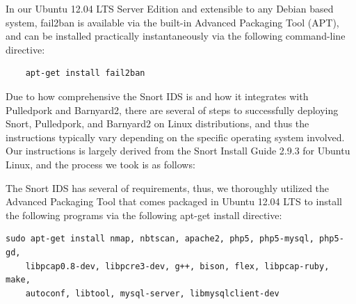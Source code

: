 \documentclass[12pt,letterpaper,titlepage]{report}
\begin{document}
{In our Ubuntu 12.04 LTS Server Edition and extensible to any Debian based
system, fail2ban is available via the built-in Advanced Packaging Tool (APT),
and can be installed practically instantaneously via the following command-line
directive:
\begin{verbatim}
    apt-get install fail2ban
\end{verbatim}
Due to how comprehensive the Snort IDS is and how it integrates with Pulledpork
and Barnyard2, there are several of steps to successfully deploying Snort,
Pulledpork, and Barnyard2 on Linux distributions, and thus the instructions
typically vary depending on the specific operating system involved.  Our
instructions is largely derived from the Snort Install Guide 2.9.3 for Ubuntu
Linux, and the process we took is as follows:

The Snort IDS has several of requirements, thus, we thoroughly utilized the
Advanced Packaging Tool that comes packaged in Ubuntu 12.04 LTS to install the
following programs via the following apt-get install directive:


\begin{verbatim}
sudo apt-get install nmap, nbtscan, apache2, php5, php5-mysql, php5-gd,
    libpcap0.8-dev, libpcre3-dev, g++, bison, flex, libpcap-ruby, make,
    autoconf, libtool, mysql-server, libmysqlclient-dev
\end{verbatim}

}
\end{document}
